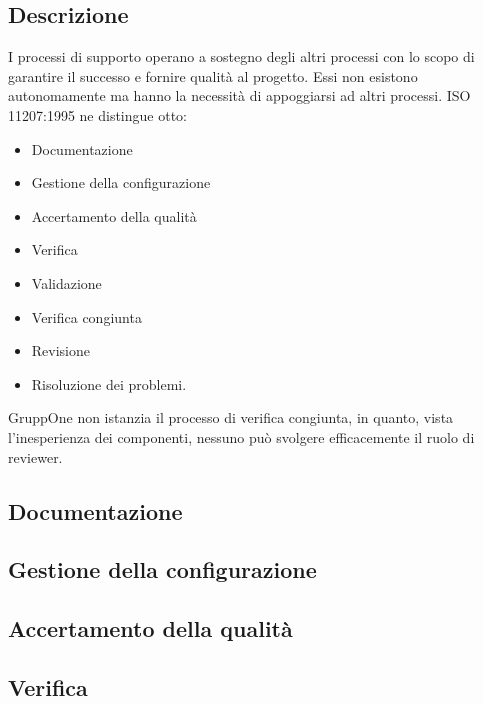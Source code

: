 \documentclass[../norme-di-progetto.tex]{subfiles}
\begin{document}
\subsection{Descrizione}%
\label{sub:processi_di_supporto/descrizione}

I processi di supporto operano a sostegno degli altri processi con lo scopo di garantire il successo e fornire qualità al progetto.
Essi non esistono autonomamente ma hanno la necessità di appoggiarsi ad altri processi.
ISO 11207:1995 ne distingue otto:

\begin{itemize}
  \item Documentazione
  \item Gestione della configurazione
  \item Accertamento della qualità
  \item Verifica
  \item Validazione
  \item Verifica congiunta
  \item Revisione
  \item Risoluzione dei problemi.
\end{itemize}

GruppOne non istanzia il processo di verifica congiunta, in quanto, vista l'inesperienza dei componenti, nessuno può svolgere efficacemente il ruolo di reviewer.

\subsection{Documentazione}%
\label{sub:documentazione}



\subsection{Gestione della configurazione}%
\label{sub:gestione_della_configurazione}



\subsection{Accertamento della qualità}%
\label{sub:accertamento_della_qualita}



\subsection{Verifica}%
\label{sub:verifica}
\end{document}
